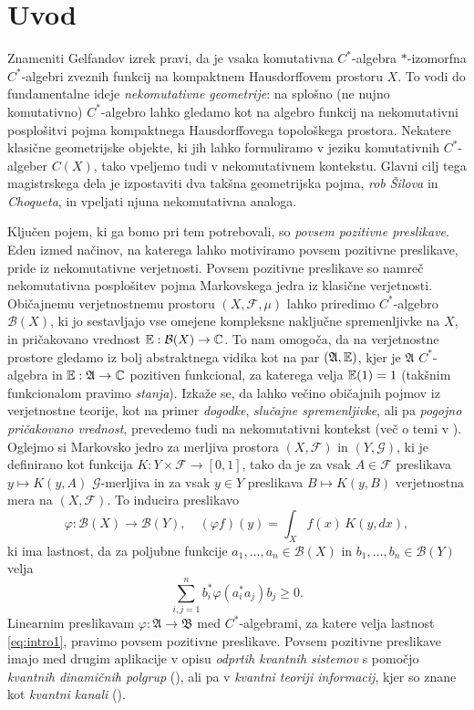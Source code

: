 \section{Uvod}

Znameniti Gelfandov izrek pravi, da je vsaka komutativna $C^*$-algebra 
$*$-izomorfna $C^*$-algebri zveznih funkcij na kompaktnem Hausdorffovem prostoru $X$.
To vodi do fundamentalne ideje \emph{nekomutativne geometrije}: na splošno (ne nujno komutativno) $C^*$-algebro
lahko gledamo kot na algebro funkcij na nekomutativni posplošitvi pojma kompaktnega Hausdorffovega topološkega prostora.
Nekatere klasične geometrijske objekte, ki jih lahko formuliramo v jeziku komutativnih $C^*$-algeber $C(X)$, 
tako vpeljemo tudi v nekomutativnem kontekstu. 
Glavni cilj tega magistrskega dela je izpostaviti dva takšna geometrijska pojma, \emph{rob Šilova} in \emph{Choqueta},
in vpeljati njuna nekomutativna analoga.

Ključen pojem, ki ga bomo pri tem potrebovali, so \emph{povsem pozitivne preslikave}.
Eden izmed načinov, na katerega lahko motiviramo povsem pozitivne preslikave, pride iz nekomutativne verjetnosti.
Povsem pozitivne preslikave so namreč nekomutativna posplošitev pojma {Markovskega jedra} iz klasične verjetnosti.
Običajnemu verjetnostnemu prostoru $(X, \mathcal{F}, \mu)$ lahko priredimo $C^*$-algebro $\mathcal{B} (X)$,
ki jo sestavljajo vse omejene kompleksne naključne spremenljivke na $X$, in pričakovano vrednost $\mathbb E: \mathcal{B} (X) \to \mathbb C$.
To nam omogoča, da na verjetnostne prostore gledamo iz bolj abstraktnega vidika
kot na par $(\mathfrak{A}, \mathbb E)$,
kjer je $\mathfrak{A}$ $C^*$-algebra in $\mathbb E: \mathfrak{A} \to \mathbb C$ pozitiven funkcional,
za katerega velja $\mathbb E (1) = 1$ (takšnim funkcionalom pravimo \emph{stanja}).
Izkaže se, da lahko večino običajnih pojmov iz verjetnostne teorije, kot na primer \emph{dogodke}, \emph{slučajne spremenljivke}, ali pa \emph{pogojno pričakovano vrednost}, 
prevedemo tudi na nekomutativni kontekst
(več o temi v \cite{nicaspeicher2006}). Oglejmo si Markovsko jedro za merljiva prostora $(X, \mathcal{F})$ in $(Y, \mathcal{G})$,
ki je definirano kot funkcija $K: Y \times \mathcal{F} \to [0, 1]$,
tako da je za vsak $A \in \mathcal{F}$ preslikava $y \mapsto K(y, A)$ $\mathcal{G}$-merljiva in 
za vsak $y \in Y$ preslikava $B \mapsto K(y, B)$ verjetnostna mera na $(X, \mathcal{F})$.
To inducira preslikavo 
$$\varphi: \mathcal{B}(X) \to \mathcal{B}(Y),\quad (\varphi f)(y) = \int_X f(x)\, K(y, dx),$$
ki ima lastnost, da za poljubne funkcije $a_1, \dots, a_n \in \mathcal{B}(X)$ in $b_1, \dots, b_n \in \mathcal{B}(Y)$ velja 
\begin{equation}\label{eq:intro1}
    \sum_{i, j = 1} ^n b_i ^* \varphi(a_i ^* a_j) b_j \geq 0.
\end{equation}
Linearnim preslikavam $\varphi: \mathfrak{A} \to \mathfrak{B}$ med $C^*$-algebrami,
za katere velja lastnost \eqref{eq:intro1}, pravimo povsem pozitivne preslikave.
Povsem pozitivne preslikave imajo med drugim aplikacije v opisu \emph{odprtih kvantnih sistemov} s pomočjo
\emph{kvantnih dinamičnih polgrup} %
(\cite{attaljoyepillet2006}),
ali pa v \emph{kvantni teoriji informacij}, kjer so znane kot \emph{kvantni kanali} (\cite{nielsenchuang2010}).

